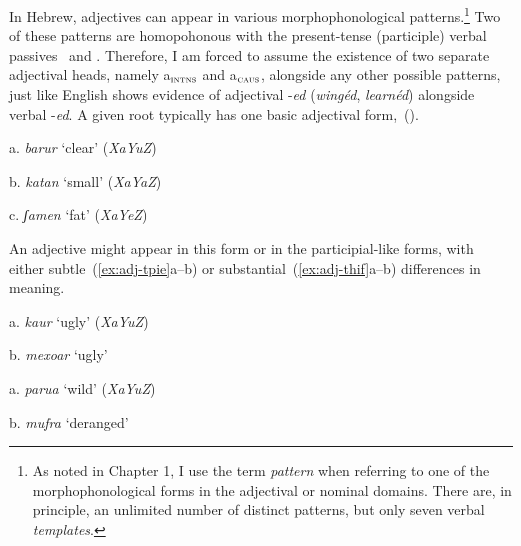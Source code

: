 In Hebrew, adjectives can appear in various morphophonological patterns.\footnote{As noted in Chapter 1, I use the term \emph{pattern} when referring to one of the morphophonological forms in the adjectival or nominal domains. There are, in principle, an unlimited number of distinct patterns, but only seven verbal \emph{templates}.} Two of these patterns are homopohonous with the present-tense (participle) verbal passives \mpua~and \mhuf. Therefore, I am forced to assume the existence of two separate adjectival heads, namely a$_{\text{\gsc{INTNS}}}$ and a$_{\text{\gsc{CAUS}}}$, alongside any other possible patterns, just like English shows evidence of adjectival -\emph{ed} (\emph{wingéd}, \emph{learnéd}) alongside verbal -\emph{ed}. A given root typically has one basic adjectival form,~(\nextx).
\ex
	\begin{minipage}[t]{0.3\textwidth}
		a. \emph{barur} `clear' (\emph{XaYuZ})\\
	\end{minipage}
	\begin{minipage}[t]{0.3\textwidth}
		b. \emph{katan} `small' (\emph{XaYaZ})\\
	\end{minipage}
	\begin{minipage}[t]{0.3\textwidth}
		c. \emph{ʃamen} `fat' (\emph{XaYeZ})\\
	\end{minipage}
\xe
An adjective might appear in this form or in the participial-like forms, with either subtle~(\ref{ex:adj-tpie}a--b) or substantial~(\ref{ex:adj-thif}a--b) differences in meaning.
\ex\label{ex:adj-tpie}
	\begin{minipage}[t]{0.3\textwidth}
		a. \emph{kaur} `ugly' (\emph{XaYuZ})\\
	\end{minipage}
	\begin{minipage}[t]{0.3\textwidth}
		b. \emph{mexoar} `ugly'\\
	\end{minipage}
\xe

\ex\label{ex:adj-thif}
	\begin{minipage}[t]{0.3\textwidth}
		a. \emph{parua} `wild' (\emph{XaYuZ})\\
	\end{minipage}
	\begin{minipage}[t]{0.3\textwidth}
		b. \emph{mufra} `deranged'\\
	\end{minipage}
\xe

